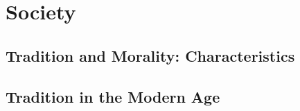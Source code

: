\chapter{Society}

\section{Tradition and Morality: Characteristics}

\section{Tradition in the Modern Age}
